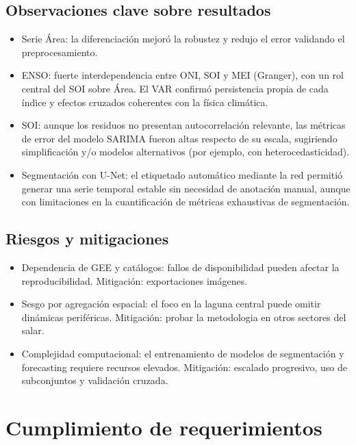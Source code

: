 \subsection{Observaciones clave sobre resultados}
\begin{itemize}
    \item Serie Área: la diferenciación mejoró la robustez y redujo el error validando el preprocesamiento.
    \item ENSO: fuerte interdependencia entre ONI, SOI y MEI (Granger), con un rol central del SOI sobre Área. El VAR confirmó persistencia propia de cada índice y efectos cruzados coherentes con la física climática.
    \item SOI: aunque los residuos no presentan autocorrelación relevante, las métricas de error del modelo SARIMA fueron altas respecto de su escala, sugiriendo simplificación y/o modelos alternativos (por ejemplo, con heterocedasticidad).
    \item Segmentación con U-Net: el etiquetado automático mediante la red permitió generar una serie temporal estable sin necesidad de anotación manual, aunque con limitaciones en la cuantificación de métricas exhaustivas de segmentación.
\end{itemize}


\subsection{Riesgos y mitigaciones}
\begin{itemize}
    \item Dependencia de GEE y catálogos: fallos de disponibilidad pueden afectar la reproducibilidad. Mitigación: exportaciones imágenes.
    \item Sesgo por agregación espacial: el foco en la laguna central puede omitir dinámicas periféricas. Mitigación: probar la metodologia en otros sectores del salar.
     \item Complejidad computacional: el entrenamiento de modelos de segmentación y forecasting requiere recursos elevados. Mitigación: escalado progresivo, uso de subconjuntos y validación cruzada.
\end{itemize}



\section{Cumplimiento de requerimientos}

